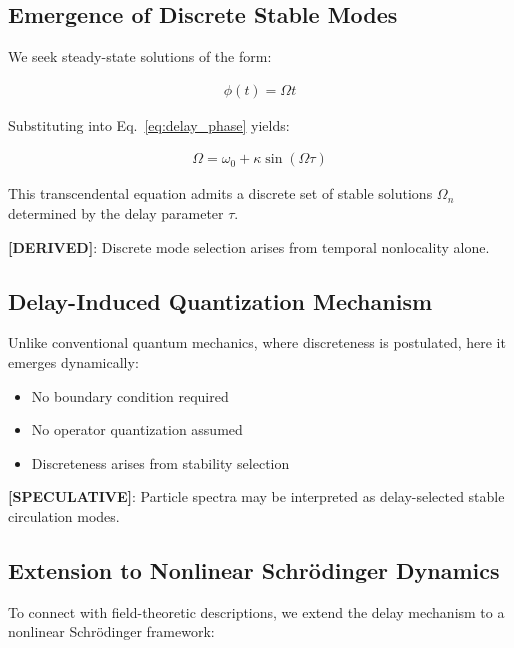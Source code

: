 \documentclass[11pt]{article}
\theoremstyle{definition}
\theoremstyle{plain}
\theoremstyle{remark}
\begin{document}
    \subsection{Emergence of Discrete Stable Modes}
        
        We seek steady-state solutions of the form:
        
        \begin{align}
            \phi(t) = \Omega t
        \end{align}
        
        Substituting into Eq.~\ref{eq:delay_phase} yields:
        
        \begin{align}
            \Omega = \omega_0 + \kappa \sin(\Omega \tau)
            \label{eq:mode_condition}
        \end{align}
        
        This transcendental equation admits a discrete set of stable solutions $\Omega_n$ determined by the delay parameter $\tau$.
        
        \textbf{[DERIVED]}: Discrete mode selection arises from temporal nonlocality alone.
    
    \subsection{Delay-Induced Quantization Mechanism}
        
        Unlike conventional quantum mechanics, where discreteness is postulated, here it emerges dynamically:
        
        \begin{itemize}
            \item No boundary condition required
            \item No operator quantization assumed
            \item Discreteness arises from stability selection
        \end{itemize}
        
        \textbf{[SPECULATIVE]}: Particle spectra may be interpreted as delay-selected stable circulation modes.
    
    \subsection{Extension to Nonlinear Schrödinger Dynamics}
        
        To connect with field-theoretic descriptions, we extend the delay mechanism to a nonlinear Schrödinger framework:
        
\end{document}
